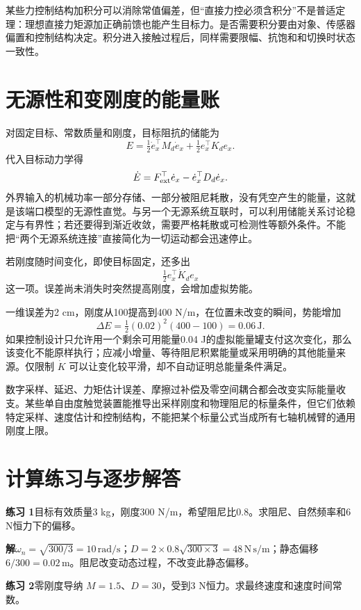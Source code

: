 某些力控制结构加积分可以消除常值偏差，但“直接力控必须含积分”不是普适定理：理想直接力矩源加正确前馈也能产生目标力。是否需要积分要由对象、传感器偏置和控制结构决定。积分进入接触过程后，同样需要限幅、抗饱和和切换时状态一致性。

\section{无源性和变刚度的能量账}

对固定目标、常数质量和刚度，目标阻抗的储能为
\[
E=\tfrac12\dot e_x^\top M_d\dot e_x+
\tfrac12e_x^\top K_de_x.
\]
代入目标动力学得
\[
\dot E=F_{\rm ext}^\top\dot e_x-
\dot e_x^\top D_d\dot e_x.
\]
外界输入的机械功率一部分存储、一部分被阻尼耗散，没有凭空产生的能量，这就是该端口模型的无源性直觉。与另一个无源系统互联时，可以利用储能关系讨论稳定与有界性；若还要得到渐近收敛，需要严格耗散或可检测性等额外条件。不能把“两个无源系统连接”直接简化为一切运动都会迅速停止。

若刚度随时间变化，即使目标固定，还多出
\[
\tfrac12e_x^\top\dot K_de_x
\]
这一项。误差尚未消失时突然提高刚度，会增加虚拟势能。

\begin{examplebox}[算例 15I 刚度变化需要多少能量]
一维误差为2 cm，刚度从100提高到400 N/m，在位置未改变的瞬间，势能增加
\[
\Delta E=\tfrac12(0.02)^2(400-100)=0.06\,\mathrm{J}.
\]
如果控制设计只允许用一个剩余可用能量0.04 J的虚拟能量罐支付这次变化，那么该变化不能原样执行；应减小增量、等待阻尼积累能量或采用明确的其他能量来源。仅限制 $\dot K$ 可以让变化较平滑，却不自动证明总能量条件满足。
\end{examplebox}

数字采样、延迟、力矩估计误差、摩擦过补偿及零空间耦合都会改变实际能量收支。某些单自由度触觉装置能推导出采样刚度和物理阻尼的标量条件，但它们依赖特定采样、速度估计和控制结构，不能把某个标量公式当成所有七轴机械臂的通用刚度上限。

\section{计算练习与逐步解答}

\textbf{练习 1}\quad 目标有效质量3 kg，刚度300 N/m，希望阻尼比0.8。求阻尼、自然频率和6 N恒力下的偏移。

\textbf{解}\quad $\omega_n=\sqrt{300/3}=10\,\mathrm{rad/s}$；$D=2\times0.8\sqrt{300\times3}=48\,\mathrm{N\,s/m}$；静态偏移 $6/300=0.02\,\mathrm{m}$。阻尼改变动态过程，不改变此静态偏移。

\textbf{练习 2}\quad 零刚度导纳 $M=1.5$、$D=30$，受到3 N恒力。求最终速度和速度时间常数。

